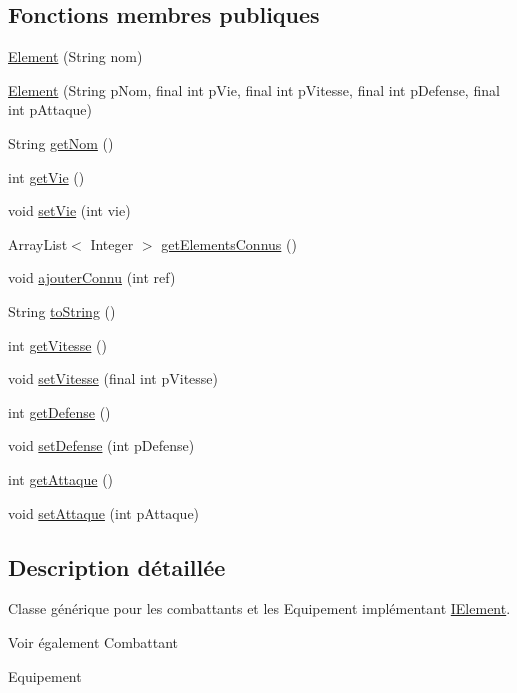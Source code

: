 \subsection*{Fonctions membres publiques}
\begin{DoxyCompactItemize}
\item 
\hyperlink{classindividu_1_1_element_a5f9423f93dc30636b89b87580f328b69}{Element} (String nom)
\item 
\hyperlink{classindividu_1_1_element_a87447c2bac2e3725755526830863b6c9}{Element} (String p\-Nom, final int p\-Vie, final int p\-Vitesse, final int p\-Defense, final int p\-Attaque)
\item 
String \hyperlink{classindividu_1_1_element_a2623a37998d1558ad9d9f9352f833cd4}{get\-Nom} ()
\item 
int \hyperlink{classindividu_1_1_element_ab41f49b096712f65285de4437f1b15b5}{get\-Vie} ()
\item 
void \hyperlink{classindividu_1_1_element_ad8c8123352986a7e80dea748e34922cc}{set\-Vie} (int vie)
\item 
Array\-List$<$ Integer $>$ \hyperlink{classindividu_1_1_element_a46430a36f795bf42832317f96fdeeb5e}{get\-Elements\-Connus} ()
\item 
void \hyperlink{classindividu_1_1_element_aaaa713cc814adae8a8dda825263b48db}{ajouter\-Connu} (int ref)
\item 
String \hyperlink{classindividu_1_1_element_af4c2b08d92cfad7532168a5ccd6c2ebb}{to\-String} ()
\item 
int \hyperlink{classindividu_1_1_element_a4ccd4fbf75bf5f1020aba19b9c78d43d}{get\-Vitesse} ()
\item 
void \hyperlink{classindividu_1_1_element_a3b22be2d0831e60fc80748c6d50fce7b}{set\-Vitesse} (final int p\-Vitesse)
\item 
int \hyperlink{classindividu_1_1_element_a5dfa6bd163796694365cbd3f5aa1548d}{get\-Defense} ()
\item 
void \hyperlink{classindividu_1_1_element_a88a02d10762bebc68026a7d8e55fa368}{set\-Defense} (int p\-Defense)
\item 
int \hyperlink{classindividu_1_1_element_a911dfb782eeaf4d472189ee9f89e9c78}{get\-Attaque} ()
\item 
void \hyperlink{classindividu_1_1_element_a8b31860817a08081a17b8fdf79ecb15e}{set\-Attaque} (int p\-Attaque)
\end{DoxyCompactItemize}


\subsection{Description détaillée}
Classe générique pour les combattants et les Equipement implémentant \hyperlink{interfaceindividu_1_1_i_element}{I\-Element}. \begin{DoxySeeAlso}{Voir également}
Combattant 

Equipement 
\end{DoxySeeAlso}


